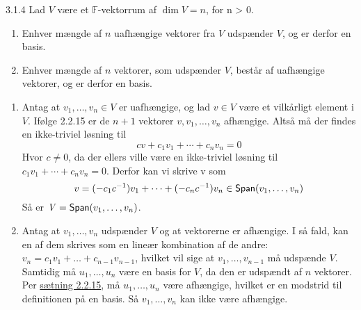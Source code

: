 \begin{saetning}{3.1.4}
	Lad $\mathit{V}$ være et $\mathbb{F}$-vektorrum af $\dim\mathit{V} = n$,
	for n > 0.

	\begin{enumerate}
		\itemsep -0.1em
		\item Enhver mængde af $n$ uafhængige vektorer fra $\mathit{V}$ 
			udspænder $\mathit{V}$, og er derfor en basis.
		\item Enhver mængde af $n$ vektorer, som udspænder $\mathit{V}$, består
			af uafhængige vektorer, og er derfor en basis.
	\end{enumerate}
\end{saetning}

\begin{bevis}
	\begin{enumerate}
		\item Antag at $v_1, \ldots, v_n \in \mathit{V}$ er uafhængige, og lad
			$v \in \mathit{V}$ være et vilkårligt element i $\mathit{V}$.
			Ifølge 2.2.15 er de $n + 1$ vektorer $v, v_1, \ldots, v_n$
			afhængige. Altså må der findes en
			ikke-triviel løsning til
			\[cv + c_1v_1 + \cdots + c_nv_n = 0\]
			Hvor $c \ne 0$, da der ellers ville være en ikke-triviel løsning
			til $c_1v_1 + \cdots + c_nv_n = 0$.
			Derfor kan vi skrive v som
			\[v = (-c_1c^{-1})v_1 + \cdots + (-c_nc^{-1})v_n \in \textsf{Span}(v_1,
			\ldots, v_n)\]
			Så er $\mathit{V} = \textsf{Span}(v_1, \ldots, v_n)$.
		\item Antag at $v_1, \ldots, v_n$ udspænder $\mathit{V}$ og at
			vektorerne er afhængige.  I så fald, kan en af dem skrives som en
			lineær kombination af de andre: $v_n = c_1v_1 + \ldots +
			c_{n-1}v_{n-1}$, hvilket vil sige at $v_1, \ldots, v_{n-1}$ må
			udspænde $\textit{V}$.  Samtidig må $u_1, \ldots, u_n$ være en
			basis for $\mathit{V}$, da den er udspændt af $n$ vektorer. Per
			\hyperlink{2.2.15}{sætning 2.2.15}, må $u_1, \ldots, u_n$ være afhængige, hvilket
			er en modstrid til definitionen på en basis. Så $v_1, \ldots, v_n$
			kan ikke være afhængige.
	\end{enumerate}
\end{bevis}
